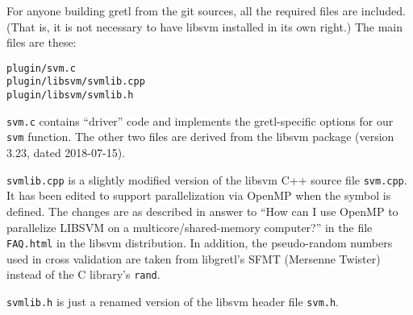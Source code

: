 \documentclass{article}
\begin{document}
For anyone building gretl from the git sources, all the required files
are included. (That is, it is not necessary to have \textsf{libsvm}
installed in its own right.)  The main files are these:
\begin{verbatim}
plugin/svm.c
plugin/libsvm/svmlib.cpp
plugin/libsvm/svmlib.h
\end{verbatim}

\texttt{svm.c} contains ``driver'' code and implements the
gretl-specific options for our \texttt{svm} function. The other two
files are derived from the \textsf{libsvm} package (version 3.23,
dated 2018-07-15).

\texttt{svmlib.cpp} is a slightly modified version of the
\textsf{libsvm} C++ source file \texttt{svm.cpp}. It has been edited
to support parallelization via \textsf{OpenMP} when the symbol
 is defined. The changes are as described in answer
to ``How can I use OpenMP to parallelize LIBSVM on a
multicore/shared-memory computer?'' in the file \texttt{FAQ.html} in
the \textsf{libsvm} distribution. In addition, the pseudo-random
numbers used in cross validation are taken from libgretl's
\textsf{SFMT} (Mersenne Twister) instead of the C library's
\texttt{rand}.

\texttt{svmlib.h} is just a renamed version of the \textsf{libsvm}
header file \texttt{svm.h}.



\end{document}
